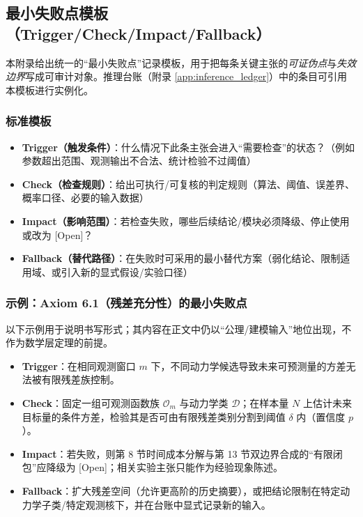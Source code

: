 \subsection{最小失败点模板（Trigger/Check/Impact/Fallback）}
\label{app:minimal_failure_point_templates}

\AuditTag 本附录给出统一的“最小失败点”记录模板，用于把每条关键主张的\emph{可证伪点}与\emph{失效边界}写成可审计对象。推理台账（附录 \ref{app:inference_ledger}）中的条目可引用本模板进行实例化。

\subsubsection{标准模板}

\begin{itemize}
  \item \textbf{Trigger（触发条件）}：什么情况下此条主张会进入“需要检查”的状态？（例如参数超出范围、观测输出不合法、统计检验不过阈值）
  \item \textbf{Check（检查规则）}：给出可执行/可复核的判定规则（算法、阈值、误差界、概率口径、必要的输入数据）
  \item \textbf{Impact（影响范围）}：若检查失败，哪些后续结论/模块必须降级、停止使用或改为 \textsf{[Open]}？
  \item \textbf{Fallback（替代路径）}：在失败时可采用的最小替代方案（弱化结论、限制适用域、或引入新的显式假设/实验口径）
\end{itemize}

\subsubsection{示例：Axiom 6.1（残差充分性）的最小失败点}

\AuditTag 以下示例用于说明书写形式；其内容在正文中仍以“公理/建模输入”地位出现，不作为数学层定理的前提。

\begin{itemize}
  \item \textbf{Trigger}：在相同观测窗口 $m$ 下，不同动力学候选导致未来可预测量的方差无法被有限残差族控制。
  \item \textbf{Check}：固定一组可观测函数族 $\mathcal O_m$ 与动力学类 $\mathcal D$；在样本量 $N$ 上估计未来目标量的条件方差，检验其是否可由有限残差类别分割到阈值 $\delta$ 内（置信度 $p$）。
  \item \textbf{Impact}：若失败，则第 8 节时间成本分解与第 13 节双边界合成的“有限闭包”应降级为 \textsf{[Open]}；相关实验主张只能作为经验现象陈述。
  \item \textbf{Fallback}：扩大残差空间（允许更高阶的历史摘要），或把结论限制在特定动力学子类/特定观测核下，并在台账中显式记录新的输入。
\end{itemize}

